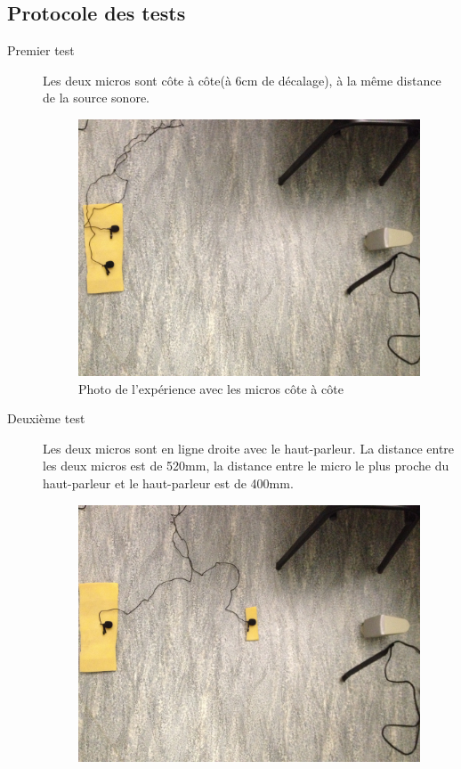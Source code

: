 \documentclass[12pt,a4paper]{report}
\begin{document}
\subsection{Protocole des tests}
\begin{description}
\item[Premier test] Les deux micros sont côte à côte(à 6cm de décalage), à la même distance de la source sonore.
	\begin{figure}[H]
	\includegraphics[width=\textwidth]{../tests/lecture_de_signaux_carres/donnees11-03/test_1.jpg} 
	\caption{Photo de l'expérience avec les micros côte à côte}
	\end{figure}
\item[Deuxième test] Les deux micros sont en ligne droite avec le haut-parleur. La distance entre les deux micros est de 520mm, la distance entre le micro le plus proche du haut-parleur et le haut-parleur est de 400mm.
	\begin{figure}[H]
	\includegraphics[width=\textwidth]{../tests/lecture_de_signaux_carres/donnees11-03/test_2.jpg} 

\end{figure}
\end{description}
\end{document}
